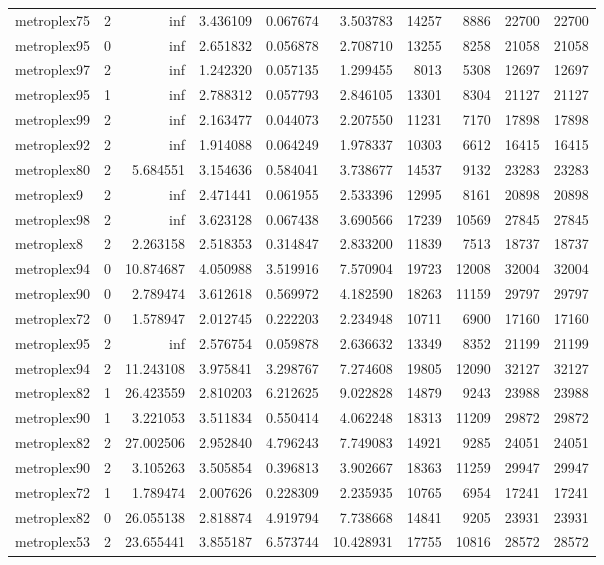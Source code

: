 \begin{longtable}{|l|r|r|r|r|r|r|r|r|r|}
metroplex75 & 2 & inf & 3.436109 & 0.067674 & 3.503783 & 14257 & 8886 & 22700 & 22700 \\
metroplex95 & 0 & inf & 2.651832 & 0.056878 & 2.708710 & 13255 & 8258 & 21058 & 21058 \\
metroplex97 & 2 & inf & 1.242320 & 0.057135 & 1.299455 & 8013 & 5308 & 12697 & 12697 \\
metroplex95 & 1 & inf & 2.788312 & 0.057793 & 2.846105 & 13301 & 8304 & 21127 & 21127 \\
metroplex99 & 2 & inf & 2.163477 & 0.044073 & 2.207550 & 11231 & 7170 & 17898 & 17898 \\
metroplex92 & 2 & inf & 1.914088 & 0.064249 & 1.978337 & 10303 & 6612 & 16415 & 16415 \\
metroplex80 & 2 & 5.684551 & 3.154636 & 0.584041 & 3.738677 & 14537 & 9132 & 23283 & 23283 \\
metroplex9 & 2 & inf & 2.471441 & 0.061955 & 2.533396 & 12995 & 8161 & 20898 & 20898 \\
metroplex98 & 2 & inf & 3.623128 & 0.067438 & 3.690566 & 17239 & 10569 & 27845 & 27845 \\
metroplex8 & 2 & 2.263158 & 2.518353 & 0.314847 & 2.833200 & 11839 & 7513 & 18737 & 18737 \\
metroplex94 & 0 & 10.874687 & 4.050988 & 3.519916 & 7.570904 & 19723 & 12008 & 32004 & 32004 \\
metroplex90 & 0 & 2.789474 & 3.612618 & 0.569972 & 4.182590 & 18263 & 11159 & 29797 & 29797 \\
metroplex72 & 0 & 1.578947 & 2.012745 & 0.222203 & 2.234948 & 10711 & 6900 & 17160 & 17160 \\
metroplex95 & 2 & inf & 2.576754 & 0.059878 & 2.636632 & 13349 & 8352 & 21199 & 21199 \\
metroplex94 & 2 & 11.243108 & 3.975841 & 3.298767 & 7.274608 & 19805 & 12090 & 32127 & 32127 \\
metroplex82 & 1 & 26.423559 & 2.810203 & 6.212625 & 9.022828 & 14879 & 9243 & 23988 & 23988 \\
metroplex90 & 1 & 3.221053 & 3.511834 & 0.550414 & 4.062248 & 18313 & 11209 & 29872 & 29872 \\
metroplex82 & 2 & 27.002506 & 2.952840 & 4.796243 & 7.749083 & 14921 & 9285 & 24051 & 24051 \\
metroplex90 & 2 & 3.105263 & 3.505854 & 0.396813 & 3.902667 & 18363 & 11259 & 29947 & 29947 \\
metroplex72 & 1 & 1.789474 & 2.007626 & 0.228309 & 2.235935 & 10765 & 6954 & 17241 & 17241 \\
metroplex82 & 0 & 26.055138 & 2.818874 & 4.919794 & 7.738668 & 14841 & 9205 & 23931 & 23931 \\
metroplex53 & 2 & 23.655441 & 3.855187 & 6.573744 & 10.428931 & 17755 & 10816 & 28572 & 28572 \\
\end{longtable}
